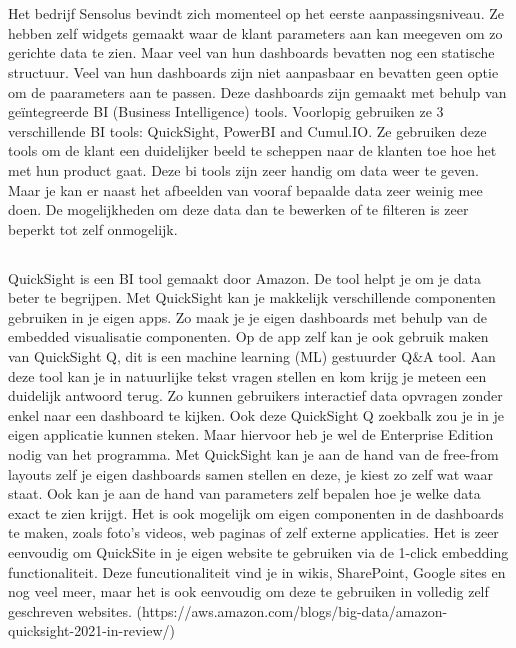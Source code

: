 \section{}%
\label{sec:huidigeStaatBedrijf}
Het bedrijf Sensolus bevindt zich momenteel op het eerste aanpassingsniveau. Ze hebben zelf widgets gemaakt waar de klant parameters aan kan meegeven om zo gerichte data te zien. Maar veel van hun dashboards bevatten nog een statische structuur. Veel van hun dashboards zijn niet aanpasbaar en bevatten geen optie om de paarameters aan te passen. Deze dashboards zijn gemaakt met behulp van geïntegreerde	BI (Business Intelligence) tools. Voorlopig gebruiken ze 3 verschillende BI tools: QuickSight, PowerBI and Cumul.IO. Ze gebruiken deze tools om de klant een duidelijker beeld te scheppen naar de klanten toe hoe het met hun product gaat.  Deze bi tools zijn zeer handig om data weer te geven. Maar je kan er naast het afbeelden van vooraf bepaalde data zeer weinig mee doen. De mogelijkheden om deze data dan te bewerken of te filteren is zeer beperkt tot zelf onmogelijk.

\subsection{}%
\label{sec:quickSight}
QuickSight is een BI tool gemaakt door Amazon. De tool helpt je om je data beter te begrijpen. Met QuickSight kan je makkelijk verschillende componenten gebruiken in je eigen apps. Zo maak je je eigen dashboards met behulp van de embedded visualisatie componenten. Op de app zelf kan je ook gebruik maken van QuickSight Q, dit is een machine learning (ML) gestuurder Q&A tool. Aan deze tool kan je in natuurlijke tekst vragen stellen en kom krijg je meteen een duidelijk antwoord terug. Zo kunnen gebruikers interactief data opvragen zonder enkel naar een dashboard te kijken. Ook deze QuickSight Q zoekbalk zou je in je eigen applicatie kunnen steken. Maar hiervoor heb je wel de Enterprise Edition nodig van het programma. Met QuickSight kan je aan de hand van de free-from layouts zelf je eigen dashboards samen stellen en deze, je kiest zo zelf wat waar staat. Ook kan je aan de hand van parameters zelf bepalen hoe je welke data exact te zien krijgt. Het is ook mogelijk om eigen componenten in de  dashboards te maken, zoals foto's videos, web paginas of zelf externe applicaties. Het is zeer eenvoudig om QuickSite in je eigen website te gebruiken via de 1-click embedding functionaliteit. Deze funcutionaliteit vind je in wikis, SharePoint, Google sites en nog veel meer, maar het is ook eenvoudig om deze te gebruiken in volledig zelf geschreven websites.
(https://aws.amazon.com/blogs/big-data/amazon-quicksight-2021-in-review/)


